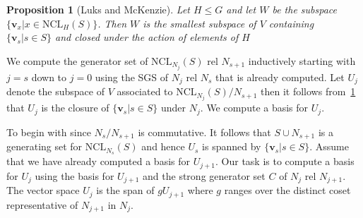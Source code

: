 \documentclass[11pt]{madras}%
\newtheorem{proposition}[theorem]{Proposition}
\theoremstyle{remark}
\newcommand{\NCL}[2][]{\ensuremath{\mathrm{NCL}_{#1}({#2})}}
\begin{document}
\begin{proposition}[Luks and McKenzie]\label{prop-linear-closure}
  Let $H \leq G$ and let $W$ be the subspace $\{ \mathbf{v}_x | x \in
  \NCL[H]{S} \}$. Then $W$ is the smallest subspace of $V$ containing
  $\{ \mathbf{v}_s | s \in S \}$ and closed under the action of
  elements of $H$
\end{proposition}


We compute the generator set of $\NCL[N_j]{S}$ rel $N_{s+1}$
inductively starting with $j = s$ down to $j =0$ using the SGS of
$N_j$ rel $N_s$ that is already computed. Let $U_j$ denote the
subspace of $V$ associated to $\NCL[N_j]{S}/N_{s+1}$ then it follows
from~\ref{prop-linear-closure} that $U_j$ is the closure of $\{
\mathbf{v}_s | s \in S \}$ under $N_j$. We compute a basis for $U_j$.

To begin with since $N_s/N_{s+1}$ is commutative. It follows that $S
\cup N_{s+1}$ is a generating set for $\NCL[N_s]{S}$ and hence $U_s$
is spanned by $\{ \mathbf{v}_s | s \in S \}$. Assume that we have
already computed a basis for $U_{j+1}$. Our task is to compute a basis
for $U_j$ using the basis for $U_{j+1}$ and the strong generator set
$C$ of $N_j$ rel $N_{j+1}$. The vector space $U_j$ is the span of $g
U_{j+1}$ where $g$ ranges over the distinct coset representative of
$N_{j+1}$ in $N_j$.
\end{document}
